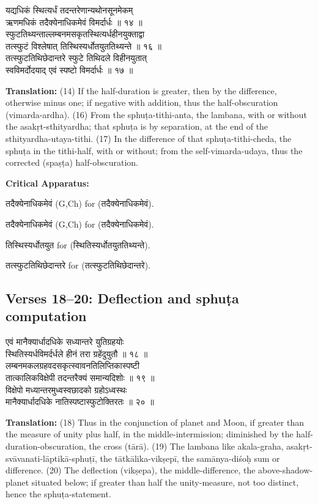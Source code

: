 \documentclass[11pt,a4paper]{article}
\newcommand{\dev}[1]{{\devanagarifont #1}}
\newcommand{\sanskritcol}[1]{%
  \begin{minipage}[t]{0.47\textwidth}
  \vspace{0pt}
  \begin{flushleft}
  #1
  \end{flushleft}
  \end{minipage}%
  \hfill
}
\newcommand{\englishcol}[1]{%
  \begin{minipage}[t]{0.47\textwidth}
  \vspace{0pt}
  \begin{flushleft}
  #1
  \end{flushleft}
  \end{minipage}%
}
\newenvironment{variants}{%
  \small%
  \color{varecolor}%
  \list{}{\leftmargin=2em\itemindent=-1em}%
}{\endlist}
\begin{document}
\noindent
\sanskritcol{\dev{यद्यधिकं स्थित्यर्धं तदन्तरेणान्यथोनसूनमेकम्} \\ \dev{ऋणमधिकं तदैक्येनाधिकमेवं विमर्दार्धः ॥ १४ ॥} \\[0.2cm]
\dev{स्फुटतिथ्यन्ताल्लम्बनमसकृतस्थित्यर्धहीनयुक्ताद्वा} \\ \dev{तत्स्फुटं विश्लेषात् तिस्थिस्यर्धोतयुततिथ्यन्ते ॥ १६ ॥} \\[0.2cm]
\dev{तत्स्फुटतिथिछेदान्तरे स्फुटे तिथिदले विहीनयुतात्} \\ \dev{स्वविमर्दोदयाद् एवं स्पष्टो विमर्दार्धः ॥ १७ ॥}}
\englishcol{\textbf{Translation:} (14) If the half-duration is greater, then by the difference,
otherwise minus one; if negative with addition, thus the half-obscuration (vimarda-ardha).
(16) From the sphuṭa-tithi-anta, the lambana, with or without the asakṛt-sthityardha;
that sphuṭa is by separation, at the end of the sthityardha-utaya-tithi. (17) In the
difference of that sphuṭa-tithi-cheda, the sphuṭa in the tithi-half, with or without;
from the self-vimarda-udaya, thus the corrected (spaṣṭa) half-obscuration.}

\vspace{0.4cm}
\textcolor{varecolor}{\textbf{Critical Apparatus:}}
\begin{variants}
\item[14.1] \dev{तदैक्येनाधिकमेवं} (G,Ch) \dev{for} (\dev{तदैक्येनाधिकमेवं}).
\item[15.1] \dev{तदैक्येनाधिकमेवं} (G,Ch) \dev{for} (\dev{तदैक्येनाधिकमेवं}).
\item[16.1] \dev{तिस्थिस्यर्धोतयुत} \dev{for} (\dev{स्थितिस्यर्धोतयुततिथ्यन्ते}).
\item[17.1] \dev{तत्स्फुटतिथिछेदान्तरे} \dev{for} (\dev{तत्स्फुटतिथिछेदान्तरे}).
\end{variants}

\subsection*{Verses 18--20: Deflection and sphuṭa computation}

\noindent
\sanskritcol{\dev{एवं मानैक्यार्धादधिके सध्यान्तरे युतिग्रहयोः} \\ \dev{स्थितिस्यर्धविमर्दर्धले हीनं तरा ग्रहेंदुयुतौ ॥ १८ ॥} \\[0.2cm]
\dev{लम्बनमकलग्रहवदसकृत्स्वावनतिलिप्तिकास्पष्टी} \\ \dev{तात्कालिकविक्षेपी तदन्तरैक्यं समान्यदिशोः ॥ १९ ॥} \\[0.2cm]
\dev{विक्षेपो मध्यान्तरमुध्वस्वछादको ग्रहोऽध्वस्थः} \\ \dev{मानैक्यार्धादधिके नातिस्पष्टास्फुटोक्तिरतः ॥ २० ॥}}
\englishcol{\textbf{Translation:} (18) Thus in the conjunction of planet and Moon, if greater
than the measure of unity plus half, in the middle-intermission; diminished by the
half-duration-obscuration, the cross (tārā). (19) The lambana like akala-graha,
asakṛt-svāvanati-lāptikā-sphuṭī, the tātkālika-vikṣepī, the samānya-diśoḥ sum or
difference. (20) The deflection (vikṣepa), the middle-difference, the above-shadow-planet
situated below; if greater than half the unity-measure, not too distinct, hence
the sphuṭa-statement.}
\end{document}
